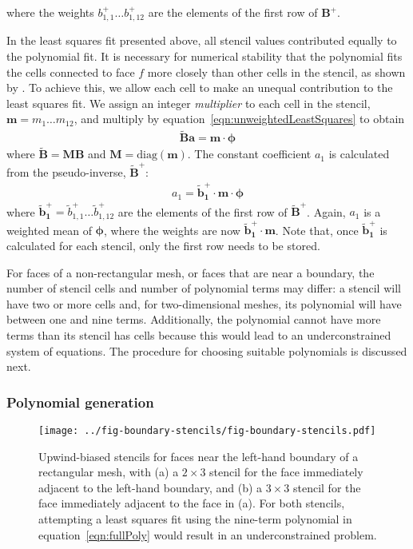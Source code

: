 where the weights $b_{1,1}^+ \ldots b_{1,12}^+$ are the elements of the first row of $\mathbf{B}^+$.

In the least squares fit presented above, all stencil values contributed equally to the polynomial fit.
It is necessary for numerical stability that the polynomial fits the cells connected to face $f$ more closely than other cells in the stencil, as shown by \citep{lashley2002}.
To achieve this, we allow each cell to make an unequal contribution to the least squares fit.
We assign an integer \textit{multiplier} to each cell in the stencil, $\mathbf{m} = m_1 \ldots m_{12}$, and multiply by equation~\eqref{eqn:unweightedLeastSquares} to obtain
\begin{align}
	\mathbf{\tilde{B}} \mathbf{a} = \mathbf{m} \cdot \bm{\phi}
\end{align}
where $\mathbf{\tilde{B}} = \mathbf{M} \mathbf{B}$ and $\mathbf{M} = \mathrm{diag}(\mathbf{m})$.  The constant coefficient $a_1$ is calculated from the pseudo-inverse, $\mathbf{\tilde{B}}^+$:
\begin{align}
	a_1 = \mathbf{\tilde{b}_1^+} \cdot \mathbf{m} \cdot \mathbf{\phi} \label{eqn:weightedPinv}
\end{align}
where $\mathbf{\tilde{b}_1^+} = \tilde{b}_{1,1}^+ \ldots \tilde{b}_{1,12}^+$ are the elements of the first row of $\mathbf{\tilde{B}}^+$.
Again, $a_1$ is a weighted mean of $\bm{\phi}$, where the weights are now $\mathbf{\tilde{b}_1^+} \cdot \mathbf{m}$.
Note that, once $\mathbf{\tilde{b}_1^+}$ is calculated for each stencil, only the first row needs to be stored.

For faces of a non-rectangular mesh, or faces that are near a boundary, the number of stencil cells and number of polynomial terms may differ: a stencil will have two or more cells and, for two-dimensional meshes, its polynomial will have between one and nine terms.  Additionally, the polynomial cannot have more terms than its stencil has cells because this would lead to an underconstrained system of equations.  The procedure for choosing suitable polynomials is discussed next.

\subsubsection{Polynomial generation}
\begin{figure}
	\centering
	\texttt{[image: ../fig-boundary-stencils/fig-boundary-stencils.pdf]}
	\caption{  Upwind-biased stencils for faces near the left-hand boundary of a rectangular mesh, with (a) a $2 \times 3$ stencil for the face immediately adjacent to the left-hand boundary, and (b) a $3 \times 3$ stencil for the face immediately adjacent to the face in (a).  For both stencils, attempting a least squares fit using the nine-term polynomial in equation~\eqref{eqn:fullPoly} would result in an underconstrained problem.}
	\label{fig:boundaryStencils}
\end{figure}

